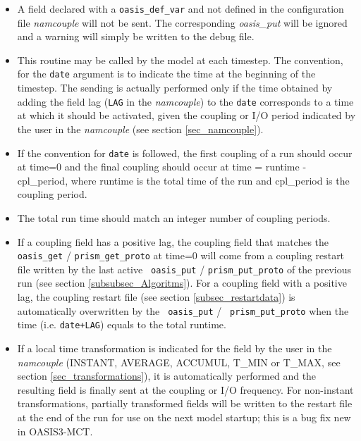 \begin{itemize}

\item A field declared  with a {\tt oasis\_def\_var} and not defined in the configuration file {\it namcouple} will not be sent. The corresponding {\it oasis\_put} will be ignored and a warning will simply be written to the debug file.
\item This routine may be called by the model at each timestep. The
  convention, for the {\tt date} argument is to indicate the time at
  the beginning of the timestep. The sending is actually performed
  only if the time obtained by adding the field lag ({\tt LAG} in the
  {\em namcouple}) to the {\tt date} corresponds to a time at which it
  should be activated, given the coupling or I/O period indicated by
  the user in the {\it namcouple} (see section \ref{sec_namcouple}). 
\item If the convention for {\tt date} is followed, the first
  coupling of a run should occur at time=0 and the final coupling
  should occur at time = runtime - cpl\_period, where runtime is the
  total time of the run and cpl\_period is the coupling period. 
\item The total run time should match an integer number of coupling
  periods.
\item If a coupling field has a positive lag, the coupling field that
  matches the {\tt oasis\_get} / {\tt prism\_get\_proto} at time=0
  will come from a coupling restart file written by the last active {\tt
  oasis\_put} / {\tt prism\_put\_proto} of the previous run (see
  section \ref{subsubsec_Algoritms}). For a coupling field with a
  positive lag, the coupling restart file (see section
  \ref{subsec_restartdata}) is automatically overwritten by the {\tt
  oasis\_put} / {\tt
    prism\_put\_proto} when the time (i.e. {\tt date+LAG}) equals
  to the total runtime.
\item If a local time transformation is indicated for the field by the
  user in the {\it namcouple} (INSTANT, AVERAGE, ACCUMUL, T\_MIN or
  T\_MAX, see section \ref{sec_transformations}), it is automatically
  performed and the resulting field is finally sent at the coupling or
  I/O frequency.  For non-instant transformations, partially
  transformed fields will be written to the restart file at the end of
  the run for use on the next model startup; this is a bug fix new in
  OASIS3-MCT.
\end{itemize}

